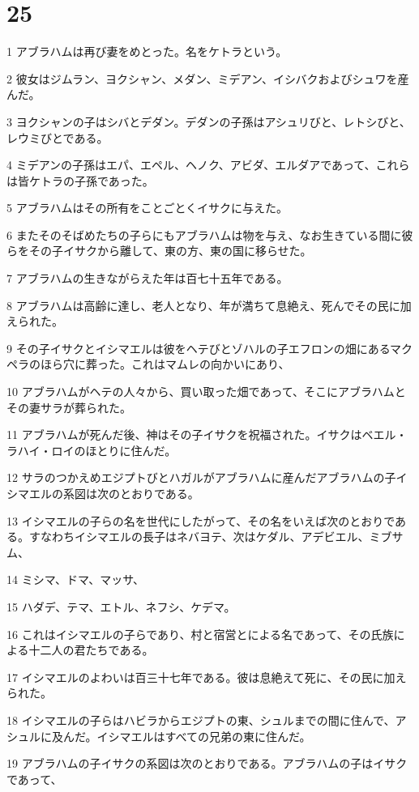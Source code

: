 \chapter{25}

\par 1 アブラハムは再び妻をめとった。名をケトラという。
\par 2 彼女はジムラン、ヨクシャン、メダン、ミデアン、イシバクおよびシュワを産んだ。
\par 3 ヨクシャンの子はシバとデダン。デダンの子孫はアシュリびと、レトシびと、レウミびとである。
\par 4 ミデアンの子孫はエパ、エペル、ヘノク、アビダ、エルダアであって、これらは皆ケトラの子孫であった。
\par 5 アブラハムはその所有をことごとくイサクに与えた。
\par 6 またそのそばめたちの子らにもアブラハムは物を与え、なお生きている間に彼らをその子イサクから離して、東の方、東の国に移らせた。
\par 7 アブラハムの生きながらえた年は百七十五年である。
\par 8 アブラハムは高齢に達し、老人となり、年が満ちて息絶え、死んでその民に加えられた。
\par 9 その子イサクとイシマエルは彼をヘテびとゾハルの子エフロンの畑にあるマクペラのほら穴に葬った。これはマムレの向かいにあり、
\par 10 アブラハムがヘテの人々から、買い取った畑であって、そこにアブラハムとその妻サラが葬られた。
\par 11 アブラハムが死んだ後、神はその子イサクを祝福された。イサクはベエル・ラハイ・ロイのほとりに住んだ。
\par 12 サラのつかえめエジプトびとハガルがアブラハムに産んだアブラハムの子イシマエルの系図は次のとおりである。
\par 13 イシマエルの子らの名を世代にしたがって、その名をいえば次のとおりである。すなわちイシマエルの長子はネバヨテ、次はケダル、アデビエル、ミブサム、
\par 14 ミシマ、ドマ、マッサ、
\par 15 ハダデ、テマ、エトル、ネフシ、ケデマ。
\par 16 これはイシマエルの子らであり、村と宿営とによる名であって、その氏族による十二人の君たちである。
\par 17 イシマエルのよわいは百三十七年である。彼は息絶えて死に、その民に加えられた。
\par 18 イシマエルの子らはハビラからエジプトの東、シュルまでの間に住んで、アシュルに及んだ。イシマエルはすべての兄弟の東に住んだ。
\par 19 アブラハムの子イサクの系図は次のとおりである。アブラハムの子はイサクであって、
